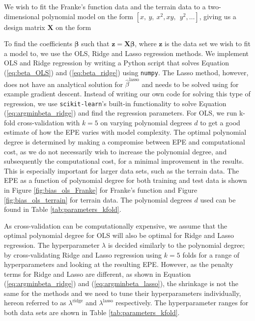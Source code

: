 \documentclass[a4paper, 10pt]{article}
\begin{document}
\begin{multicols}{2}
We wish to fit the Franke's function data and the terrain data to a two-dimensional polynomial model on the form $[x,\ y,\ x^2, xy,\ \ y^2, \dots]$,  giving us a design matrix $\bm{X}$ on the form \\

\setlength{\arraycolsep}{1.5pt}
\noindent
{}
\vspace{1pt}

\noindent
To find the coefficients $\bm{\beta}$ such that $\bm{ z} = \bm{X \beta} $, where $\bm{z}$ is the data set we wish to fit a model to, we use the OLS, Ridge and Lasso regression methods.
We implement OLS and Ridge regression by writing a Python script that solves Equation (\ref{eq:beta_OLS}) and (\ref{eq:beta_ridge}) using \texttt{numpy}. The Lasso method, however, does not have an analytical solution for $\hat{\beta}^\text{lasso}$ and needs to be solved using for example gradient descent. Instead of writing our own code for solving this type of regression, we use \texttt{scikit-learn}'s built-in functionality to solve Equation (\ref{eq:argminbeta_ridge}) and find the regression parameters.
\noindent
For OLS, we run k-fold cross-validation with $k=5$ on varying polynomial degrees $d$ to get a good estimate of how the EPE varies with model complexity. The optimal polynomial degree is determined by making a compromise between EPE and computational cost, as we do not necessarily wish to increase the polynomial degree, and subsequently the computational cost, for a minimal improvement in the results. This is especially important for larger data sets, such as the terrain data. The EPE as a function of polynomial degree for both training and test data is shown in Figure \ref{fig:bias_ols_Franke} for Franke's function and Figure \ref{fig:bias_ols_terrain} for terrain data. The polynomial degrees $d$ used can be found in Table \ref{tab:parameters_kfold}.

As cross-validation can be computationally expensive, we assume that the optimal polynomial degree for OLS will also be optimal for Ridge and Lasso regression. The hyperparameter $\lambda$ is decided similarly to the polynomial degree; by cross-validating  Ridge and Lasso regression using $k=5$ folds for a range of hyperparameters and looking at the resulting EPE. However, as the penalty terms for Ridge and Lasso are different, as shown in Equation (\ref{eq:argminbeta_ridge}) and (\ref{eq:argminbeta_lasso}), the shrinkage is not the same for the methods and we need to tune their hyperparameters individually, hereon referred to as $\lambda^\text{ridge}$ and $\lambda^\text{lasso}$ respectively. The hyperparameter ranges for both data sets  are shown in Table \ref{tab:parameters_kfold}.


\end{multicols}
\end{document}
